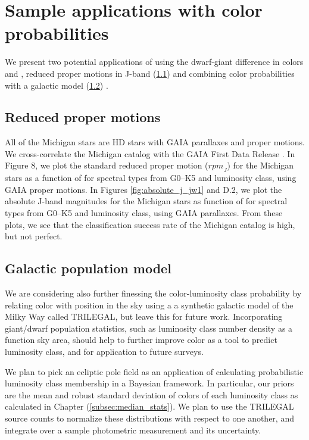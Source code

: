 \chapter{Sample applications with color probabilities }\label{Appendix:4}

We present two potential applications of using the dwarf-giant difference in colors \jwone and \jwtwo, reduced proper motions in J-band (\ref{sec:RPM}) and combining color probabilities with a galactic model (\ref{sec:galactic_model}) .

\section{Reduced proper motions} \label{sec:RPM}

All of the Michigan stars are HD stars with GAIA parallaxes and proper motions. We cross-correlate the Michigan catalog with the GAIA First Data Release \citep[]{gaia1,gaia2,Lindegren2016}.  In Figure 8, we plot the standard reduced proper motion (${rpm}_J$) for the Michigan stars as a function of \jwtwo for spectral types from G0--K5 and luminosity class, using GAIA proper motions. In Figures \ref{fig:absolute_j_jw1} and D.2, we plot the absolute J-band magnitudes for the Michigan stars as function of \jwtwo for spectral types from G0--K5 and luminosity class, using GAIA parallaxes. From these plots, we see that the classification success rate of the Michigan catalog is high, but not perfect.

\section{Galactic population model} \label{sec:galactic_model}

We are considering also further finessing the color-luminosity class probability by relating color with position in the sky using a a synthetic galactic model of the Milky Way called TRILEGAL, but leave this for future work. Incorporating giant/dwarf population statistics, such as luminosity class number density as a function sky area, should help to further improve color as a tool to predict luminosity class, and for application to future surveys.

We plan to pick an ecliptic pole field as an application of calculating probabilistic luminosity class membership in a Bayesian framework. In particular, our priors are the mean and robust standard deviation of colors of each luminosity class as calculated in Chapter (\ref{subsec:median_stats}). We plan to use the TRILEGAL source counts to normalize these distributions with respect to one another, and integrate over a sample photometric measurement and its uncertainty.

